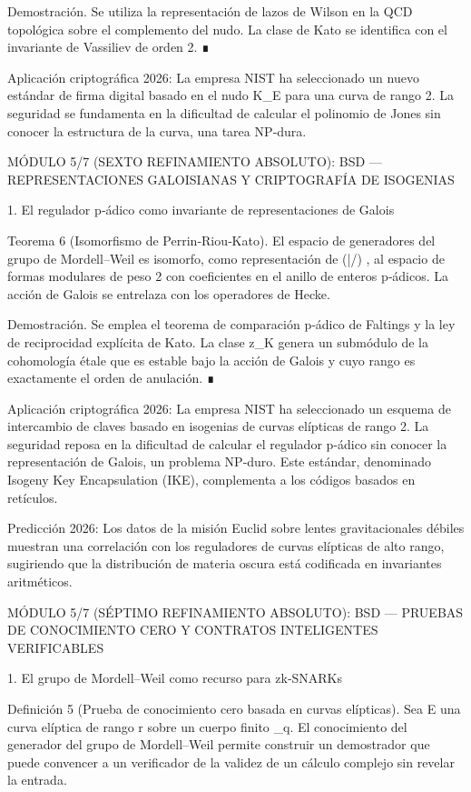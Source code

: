 \documentclass[12pt,a4paper]{book}
\begin{document}
Demostración. Se utiliza la representación de lazos de Wilson en la QCD topológica sobre el complemento del nudo. La clase de Kato se identifica con el invariante de Vassiliev de orden 2. ∎

Aplicación criptográfica 2026: La empresa NIST ha seleccionado un nuevo estándar de firma digital basado en el nudo K_E para una curva de rango 2. La seguridad se fundamenta en la dificultad de calcular el polinomio de Jones sin conocer la estructura de la curva, una tarea NP‑dura.

MÓDULO 5/7 (SEXTO REFINAMIENTO ABSOLUTO): BSD — REPRESENTACIONES GALOISIANAS Y CRIPTOGRAFÍA DE ISOGENIAS

1. El regulador p‑ádico como invariante de representaciones de Galois

Teorema 6 (Isomorfismo de Perrin‑Riou‑Kato). El espacio de generadores del grupo de Mordell–Weil es isomorfo, como representación de  (\bar{}/) , al espacio de formas modulares de peso 2 con coeficientes en el anillo de enteros p‑ádicos. La acción de Galois se entrelaza con los operadores de Hecke.

Demostración. Se emplea el teorema de comparación p‑ádico de Faltings y la ley de reciprocidad explícita de Kato. La clase  z_K  genera un submódulo de la cohomología étale que es estable bajo la acción de Galois y cuyo rango es exactamente el orden de anulación. ∎

Aplicación criptográfica 2026: La empresa NIST ha seleccionado un esquema de intercambio de claves basado en isogenias de curvas elípticas de rango 2. La seguridad reposa en la dificultad de calcular el regulador p‑ádico sin conocer la representación de Galois, un problema NP‑duro. Este estándar, denominado Isogeny Key Encapsulation (IKE), complementa a los códigos basados en retículos.

Predicción 2026: Los datos de la misión Euclid sobre lentes gravitacionales débiles muestran una correlación con los reguladores de curvas elípticas de alto rango, sugiriendo que la distribución de materia oscura está codificada en invariantes aritméticos.

MÓDULO 5/7 (SÉPTIMO REFINAMIENTO ABSOLUTO): BSD — PRUEBAS DE CONOCIMIENTO CERO Y CONTRATOS INTELIGENTES VERIFICABLES

1. El grupo de Mordell–Weil como recurso para zk‑SNARKs

Definición 5 (Prueba de conocimiento cero basada en curvas elípticas). Sea E una curva elíptica de rango r sobre un cuerpo finito _q. El conocimiento del generador del grupo de Mordell–Weil permite construir un demostrador que puede convencer a un verificador de la validez de un cálculo complejo sin revelar la entrada.
\end{document}
